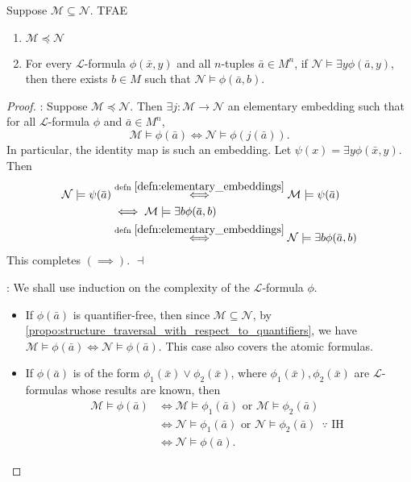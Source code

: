 \documentclass[notoc,notitlepage]{tufte-book}
\begin{document}
\begin{propo}\label{propo:tarski_vaught_test}
  Suppose $\mathcal{M} \subseteq \mathcal{N}$. TFAE
  \begin{enumerate}
    \item $\mathcal{M} \preceq \mathcal{N}$
    \item For every $\mathcal{L}$-formula $\phi(\bar{x}, y)$ and all $n$-tuples $\bar{a} \in M^n$, if $\mathcal{N} \models \exists y \phi(\bar{a}, y)$, then there exists $b \in M$ such that $\mathcal{N} \models \phi(\bar{a}, b)$.
  \end{enumerate}
\end{propo}

\begin{proof}
  : Suppose $\mathcal{M} \preceq \mathcal{N}$. Then $\exists j : \mathcal{M} \to \mathcal{N}$ an elementary embedding such that for all $\mathcal{L}$-formula $\phi$ and $\bar{a} \in M^n$, 
  \begin{equation*}
    \mathcal{M} \models \phi(\bar{a}) \iff \mathcal{N} \models \phi(j(\bar{a})).
  \end{equation*}
  In particular, the identity map is such an embedding. Let $\psi(x) = \exists y \phi(\bar{x}, y)$. Then
  \begin{align*}
    \mathcal{N} \models \psi(\bar{a}) &\overset{\text{defn }\ref{defn:elementary_embeddings}}{\iff} \mathcal{M} \models \psi(\bar{a}) \\
                                      &\iff \mathcal{M} \models \exists b \phi(\bar{a}, b) \\
                                      &\overset{\text{defn }\ref{defn:elementary_embeddings}}{\iff} \mathcal{N} \models \exists b \phi(\bar{a}, b)
  \end{align*}
  This completes $(\implies)$. $\dashv$

  \noindent{}: We shall use induction on the complexity of the $\mathcal{L}$-formula $\phi$. 
  \begin{itemize}
    \item If $\phi(\bar{a})$ is quantifier-free, then since $\mathcal{M} \subseteq \mathcal{N}$, by \cref{propo:structure_traversal_with_respect_to_quantifiers}, we have $\mathcal{M} \models \phi(\bar{a}) \iff \mathcal{N} \models \phi(\bar{a})$. This case also covers the atomic formulas.
      \item If $\phi(\bar{a})$ is of the form $\phi_1(\bar{x}) \lor \phi_2(\bar{x})$, where $\phi_1(\bar{x}), \phi_2(\bar{x})$ are $\mathcal{L}$-formulas whose results are known, then
        \begin{align*}
          \mathcal{M} \models \phi(\bar{a}) &\iff \mathcal{M} \models \phi_1(\bar{a}) \text{ or } \mathcal{M} \models \phi_2(\bar{a}) \\
                                            &\iff \mathcal{N} \models \phi_1(\bar{a}) \text{ or } \mathcal{N} \models \phi_2(\bar{a}) \enspace \because \text{ IH } \\
                                            &\iff \mathcal{N} \models \phi(\bar{a}).
        \end{align*}


\end{itemize}
\end{proof}
\end{document}

